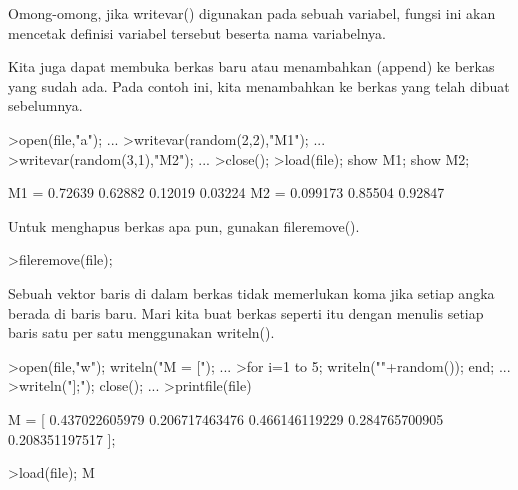 \documentclass{article}
\newenvironment{eulernotebook}{\par}{\par}
\newenvironment{eulercomment}{\par\medskip}{\par\medskip}
\begin{document}
\begin{eulernotebook}
\begin{eulercomment}
\begin{eulercomment}
\begin{eulercomment}
\begin{eulercomment}
\begin{eulercomment}
\begin{eulercomment}
\begin{euleroutput}
\end{euleroutput}
\begin{eulercomment}
Omong-omong, jika writevar() digunakan pada sebuah variabel, fungsi
ini akan mencetak definisi variabel tersebut beserta nama variabelnya.
\end{eulercomment}
\begin{eulercomment}
Kita juga dapat membuka berkas baru atau menambahkan (append) ke
berkas yang sudah ada. Pada contoh ini, kita menambahkan ke berkas
yang telah dibuat sebelumnya.
\end{eulercomment}
\begin{eulerprompt}
>open(file,"a"); ...
>writevar(random(2,2),"M1"); ...
>writevar(random(3,1),"M2"); ...
>close();
>load(file); show M1; show M2;
\end{eulerprompt}
\begin{euleroutput}
  M1 = 
    0.72639   0.62882 
    0.12019   0.03224 
  M2 = 
   0.099173 
    0.85504 
    0.92847 
\end{euleroutput}
\begin{eulercomment}
Untuk menghapus berkas apa pun, gunakan fileremove().
\end{eulercomment}
\begin{eulerprompt}
>fileremove(file);
\end{eulerprompt}
\begin{eulercomment}
Sebuah vektor baris di dalam berkas tidak memerlukan koma jika setiap
angka berada di baris baru. Mari kita buat berkas seperti itu dengan
menulis setiap baris satu per satu menggunakan writeln().
\end{eulercomment}
\begin{eulerprompt}
>open(file,"w"); writeln("M = ["); ...
>for i=1 to 5; writeln(""+random()); end; ...
>writeln("];"); close(); ...
>printfile(file)
\end{eulerprompt}
\begin{euleroutput}
  M = [
  0.437022605979
  0.206717463476
  0.466146119229
  0.284765700905
  0.208351197517
  ];
\end{euleroutput}
\begin{eulerprompt}
>load(file); M

\end{eulerprompt}
\end{eulercomment}
\end{eulercomment}
\end{eulercomment}
\end{eulercomment}
\end{eulercomment}
\end{eulercomment}
\end{eulernotebook}
\end{document}

